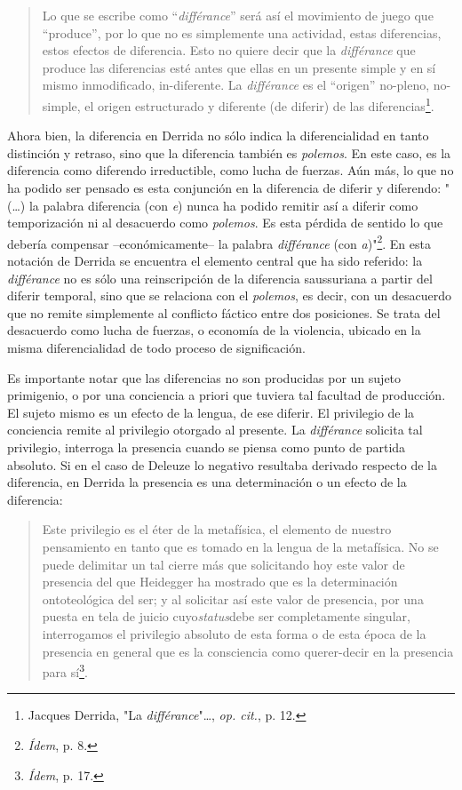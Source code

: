 \documentclass{book}
\begin{document}
\begin{quote}
Lo que se escribe como ``\emph{différance}'' será así el movimiento de
juego que ``produce'', por lo que no es simplemente una actividad, estas
diferencias, estos efectos de diferencia. Esto no quiere decir que la
\emph{différance} que produce las diferencias esté antes que ellas en un
presente simple y en sí mismo inmodificado, in-diferente. La
\emph{différance} es el ``origen'' no-pleno, no-simple, el origen
estructurado y diferente (de diferir) de las diferencias\footnote{Jacques
  Derrida, "La \emph{différance}"\ldots, \emph{op. cit.}, p. 12.}.
\end{quote}

Ahora bien, la diferencia en Derrida no sólo indica la diferencialidad
en tanto distinción y retraso, sino que la diferencia también es
\emph{polemos}. En este caso, es la diferencia como diferendo
irreductible, como lucha de fuerzas. Aún más, lo que no ha podido ser
pensado es esta conjunción en la diferencia de diferir y diferendo:
"(\dots) la palabra diferencia (con \emph{e}) nunca ha podido
remitir así a diferir como temporización ni al desacuerdo como
\emph{polemos}. Es esta pérdida de sentido lo que debería compensar
--económicamente-- la palabra \emph{différance} (con
\emph{a})"\footnote{\emph{Ídem}, p. 8.}. En esta notación de Derrida se
encuentra el elemento central que ha sido referido: la \emph{différance}
no es sólo una reinscripción de la diferencia saussuriana a partir del
diferir temporal, sino que se relaciona con el \emph{polemos}, es decir,
con un desacuerdo que no remite simplemente al conflicto fáctico entre
dos posiciones. Se trata del desacuerdo como lucha de fuerzas, o
economía de la violencia, ubicado en la misma diferencialidad de todo
proceso de significación.

Es importante notar que las diferencias no son producidas por un sujeto
primigenio, o por una conciencia a priori que tuviera tal facultad de
producción. El sujeto mismo es un efecto de la lengua, de ese diferir.
El privilegio de la conciencia remite al privilegio otorgado al
presente. La \emph{différance} solicita tal privilegio, interroga la
presencia cuando se piensa como punto de partida absoluto. Si en el caso
de Deleuze lo negativo resultaba derivado respecto de la diferencia, en
Derrida la presencia es una determinación o un efecto de la diferencia:

\begin{quote}
Este privilegio es el éter de la metafísica, el elemento de nuestro
pensamiento en tanto que es tomado en la lengua de la metafísica. No se
puede delimitar un tal cierre más que solicitando hoy este valor de
presencia del que Heidegger ha mostrado que es la determinación
ontoteológica del ser; y al solicitar así este valor de presencia, por
una puesta en tela de juicio cuyo\emph{status}debe ser completamente
singular, interrogamos el privilegio absoluto de esta forma o de esta
época de la presencia en general que es la consciencia como querer-decir
en la presencia para sí\footnote{\emph{Ídem}, p. 17.}.
\end{quote}
\end{document}
